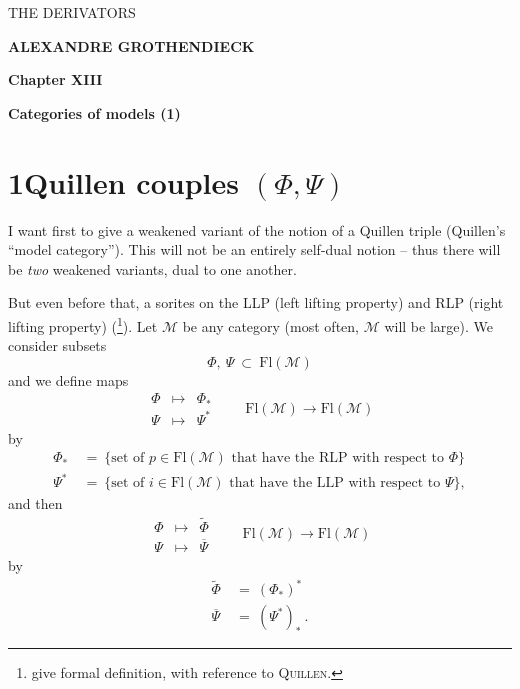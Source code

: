 \documentclass[11pt]{article}
\newcommand{\printedpage}[1]{\marginpar{\footnotesize p.~#1}}
\newcommand{\msp}[1]{\marginpar{\footnotesize [#1]}}
\newcommand{\Fl}{\mathrm{Fl}}
\newcommand{\M}{\mathcal{M}}
\begin{document}
\printedpage{--} %

\begin{center}
\vspace*{5cm}
{\LARGE\sffamily THE DERIVATORS}

\vspace{1.5cm}
{\large\textbf{ALEXANDRE GROTHENDIECK}}

\vspace{2.5cm}
{\large\textbf{Chapter XIII}}

\vspace{0.5cm}
{\large\textbf{Categories of models (1)}}
\end{center}

\clearpage


\printedpage{1}

\msp{page 1}

\section*{1\quad Quillen couples $(\Phi, \Psi)$}

I want first to give a weakened variant of the notion of a Quillen triple (Quillen's ``model category''). This will not be an entirely self-dual notion -- thus there will be \textit{two} weakened variants, dual to one another.

But even before that, a sorites on the LLP (left lifting property) and RLP (right lifting property) (\footnote[1]{give formal definition, with reference to \textsc{Quillen}.}). Let $\M$ be any category (most often, $\M$ will be large). We consider subsets
\[
\Phi,\ \Psi\ \subset\ \Fl(\M)
\]
and we define maps
\[
\boxed{\begin{array}{ccc}
\Phi & \longmapsto & \Phi_* \\[1ex]
\Psi & \longmapsto & \Psi^*
\end{array}}
\qquad
\Fl(\M) \longrightarrow \Fl(\M)
\]
 by %
\[
\begin{aligned}
\Phi_* \ &= \ \{\text{set of } p \in \Fl(\M) \text{ that have the RLP with respect to } \Phi\} \\
\Psi^* \ &= \ \{\text{set of } i \in \Fl(\M) \text{ that have the LLP with respect to } \Psi\},
\end{aligned}
\]
and then
\[
\boxed{\begin{array}{ccc}
\Phi & \longmapsto & \widetilde{\Phi} \\[1ex]
\Psi & \longmapsto & \overline{\Psi}
\end{array}}
\qquad
\Fl(\M) \longrightarrow \Fl(\M)
\]
 by %
\[
\begin{aligned}
\widetilde{\Phi} \ &= \ (\Phi_*)^* \\
\overline{\Psi} \ &= \ (\Psi^*)_* \ .
\end{aligned}
\]
\end{document}
